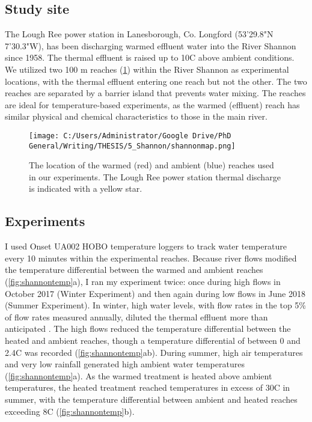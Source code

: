 \subsection{Study site}

The Lough Ree power station in Lanesborough, Co. Longford (53'29.8"N 7'30.3"W), has been discharging warmed effluent water into the River Shannon since 1958. The thermal effluent is raised up to 10\degree C above ambient conditions. We utilized two 100 m reaches (\ref{fig:shannonmap}) within the River Shannon as experimental locations, with the thermal effluent entering one reach but not the other. The two reaches are separated by a barrier island that prevents water mixing. The reaches are ideal for temperature-based experiments, as the warmed (effluent) reach has similar physical and chemical characteristics to those in the main river. 

\begin{figure}%
    \centering
    \texttt{[image: C:/Users/Administrator/Google Drive/PhD General/Writing/THESIS/5\_Shannon/shannonmap.png]}
  \caption [Map of experimental site in the River Shannon]{The location of the warmed (red) and ambient (blue) reaches used in our experiments. The Lough Ree power station thermal discharge is indicated with a yellow star.} 
    \label{fig:shannonmap}
\end{figure}

\subsection{Experiments}

I used Onset UA002 HOBO temperature loggers to track water temperature every 10 minutes within the experimental reaches. Because river flows modified the temperature differential between the warmed and ambient reaches (\ref{fig:shannontemp}a), I ran my experiment twice: once during high flows in October 2017 (Winter Experiment) and then again during low flows in June 2018 (Summer Experiment). In winter, high water levels, with flow rates in the top 5\% of flow rates measured annually, diluted the thermal effluent more than anticipated \citet{opw2018}. The high flows reduced the temperature differential between the heated and ambient reaches, though a temperature differential of between 0 and 2.4\degree C was recorded (\ref{fig:shannontemp}ab). During summer, high air temperatures and very low rainfall generated high ambient water temperatures (\ref{fig:shannontemp}a). As the warmed treatment is heated above ambient temperatures, the heated treatment reached temperatures in excess of 30\degree C in summer, with the temperature differential between ambient and heated reaches exceeding 8\degree C (\ref{fig:shannontemp}b). 

